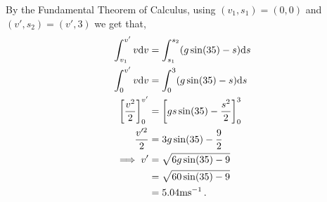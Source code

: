\begin{subquestions}
By the Fundamental Theorem of Calculus, using $(v_1,s_1)=(0,0)$ and $(v',s_2)=(v',3)$ we get that,
\begin{align}
	\int_{v_1}^{v'}v \mathrm{d} v & = \int_{s_1}^{s_2} (g\sin(35) - s) \mathrm{d} s \nonumber \\
	\int_{0}^{v'}v \mathrm{d} v & = \int_{0}^{3} (g\sin(35) - s) \mathrm{d} s \nonumber \\
	\left[\frac{v^2}{2}\right]^{v'}_0 & = \left[gs\sin(35)-\frac{s^2}{2} \right]^3_0 \nonumber \\
	 \frac{v'^2}{2} & = 3g\sin(35) - \frac{9}{2} \nonumber \\
	\implies v'& = \sqrt{6g\sin(35)-9} \nonumber \\
	           & =  \sqrt{60\sin(35)-9} \nonumber \\
	           & = 5.04 \text{ms}^{-1} \,.	           
\end{align}

\end{subquestions}